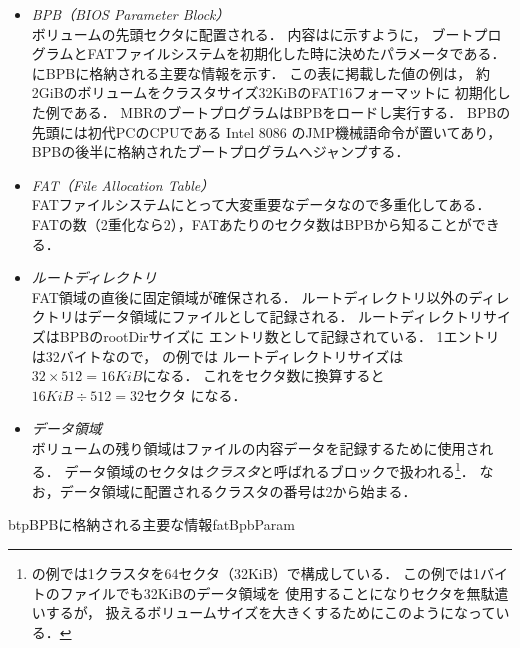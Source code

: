 \begin{itemize}
\item \emph{BPB（BIOS Parameter Block）}\\
  ボリュームの先頭セクタに配置される．
  内容はに示すように，
  ブートプログラムとFATファイルシステムを初期化した時に決めたパラメータである．
  にBPBに格納される主要な情報を示す．
  この表に掲載した値の例は，
  約2GiBのボリュームをクラスタサイズ32KiBのFAT16フォーマットに
  初期化した例である．
  MBRのブートプログラムはBPBをロードし実行する．
  BPBの先頭には初代PCのCPUである Intel 8086 のJMP機械語命令が置いてあり，
  BPBの後半に格納されたブートプログラムへジャンプする．

\item \emph{FAT（File Allocation Table）}\\
  FATファイルシステムにとって大変重要なデータなので多重化してある．
  FATの数（2重化なら2），FATあたりのセクタ数はBPBから知ることができる．

\item \emph{ルートディレクトリ}\\
  FAT領域の直後に固定領域が確保される．
  ルートディレクトリ以外のディレクトリはデータ領域にファイルとして記録される．
  ルートディレクトリサイズはBPBのrootDirサイズに
  エントリ数として記録されている．
  1エントリは32バイトなので，
  の例では
  ルートディレクトリサイズは$32 \times 512 = 16KiB$になる．
  これをセクタ数に換算すると$16KiB \div 512 = 32セクタ$ になる．

\item \emph{データ領域}\\
  ボリュームの残り領域はファイルの内容データを記録するために使用される．
  データ領域のセクタは\emph{クラスタ}と呼ばれるブロックで扱われる\footnote{
    の例では1クラスタを64セクタ（32KiB）で構成している．
    この例では1バイトのファイルでも32KiBのデータ領域を
    使用することになりセクタを無駄遣いするが，
    扱えるボリュームサイズを大きくするためにこのようになっている．}．
  なお，データ領域に配置されるクラスタの番号は2から始まる．
\end{itemize}

\begin{mytable}{btp}{BPBに格納される主要な情報}{fatBpbParam}
\end{mytable}

